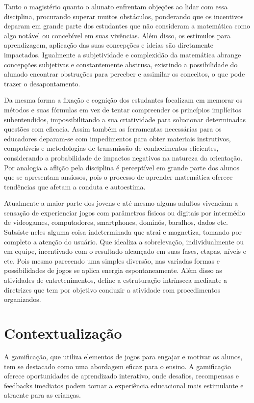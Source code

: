 Tanto o magistério quanto o alunato enfrentam objeções ao lidar com essa disciplina, procurando superar muitos obstáculos, ponderando que os incentivos deparam em grande parte dos estudantes que não consideram a matemática como algo notável ou concebível em suas vivências. Além disso, os estímulos para aprendizagem, aplicação das suas concepções e ideias são diretamente impactados. Igualmente a subjetividade e complexidão da matemática abrange concepções subjetivas e constantemente abstrusa, existindo a possibilidade do alunado encontrar obstruções para perceber e assimilar os conceitos, o que pode trazer o desapontamento. 

Da mesma forma a fixação e cognição dos estudantes focalizam em memorar os métodos e suas fórmulas em vez de tentar compreender os princípios implícitos subentendidos, impossibilitando a sua criatividade para solucionar determinadas questões com eficacia. Assim também as ferramentas necessárias para os educadores deparam-se com impedimentos para obter materiais instrutivos, compatíveis e metodologias de transmissão de conhecimentos eficientes, considerando a probabilidade de impactos negativos na natureza da orientação. Por analogia a aflição pela disciplina é perceptível em grande parte dos alunos que se apresentam ansiosos, pois o processo de aprender matemática oferece tendências que afetam a conduta e autoestima. 

Atualmente a maior parte dos jovens e até mesmo alguns adultos vivenciam a sensação de experienciar jogos com parâmetros físicos ou digitais por intermédio de videogames, computadores, smartphones, dominós, baralhos, dados etc. Subsiste neles alguma coisa indeterminada que atrai e magnetiza, tomando por completo a atenção do usuário. Que idealiza a sobrelevação, individualmente ou em equipe, incentivado com o resultado alcançado em suas fases, etapas, níveis e etc. Pois mesmo parecendo uma simples diversão, nas variadas formas e possibilidades de jogos se aplica energia espontaneamente. Além disso as atividades de entretenimentos, define a estruturação intrínseca mediante a diretrizes que tem por objetivo conduzir a atividade com procedimentos organizados.

\section{Contextualização}

A gamificação, que utiliza elementos de jogos para engajar e motivar os alunos, tem se destacado como uma abordagem eficaz para o ensino. A gamificação oferece oportunidades de aprendizado interativo, onde desafios, recompensas e feedbacks imediatos podem tornar a experiência educacional mais estimulante e atraente para as crianças.

